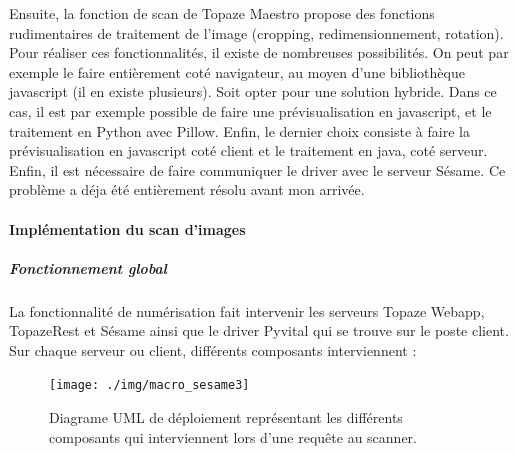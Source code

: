Ensuite, la fonction de scan de Topaze Maestro propose des fonctions rudimentaires de traitement de l'image (cropping, redimensionnement, rotation). 
Pour réaliser ces fonctionnalités, il existe de nombreuses possibilités. On peut par exemple le faire entièrement coté navigateur, au moyen d'une bibliothèque javascript (il en existe plusieurs). Soit opter pour une solution hybride. Dans ce cas, il est par exemple possible de faire une prévisualisation en javascript, et le traitement en Python avec Pillow. 
Enfin, le dernier choix consiste à faire la prévisualisation en javascript coté client et le traitement en java, coté serveur. \\

Enfin, il est nécessaire de faire communiquer le driver avec le serveur Sésame. Ce problème a déja été entièrement résolu avant mon arrivée.

\paragraph*{Implémentation du scan d'images}
\subparagraph*{Fonctionnement global}
La fonctionnalité de numérisation fait intervenir les serveurs Topaze Webapp, TopazeRest et Sésame ainsi que le driver Pyvital qui se trouve sur le poste client.
Sur chaque serveur ou client, différents composants interviennent :
\begin{figure}[H]
  \centering
  \texttt{[image: ./img/macro\_sesame3]}
  \caption{\label{fig:mb_va_ast} Diagrame UML de déploiement représentant les différents composants qui interviennent lors d'une requête au scanner.}
\end{figure}

